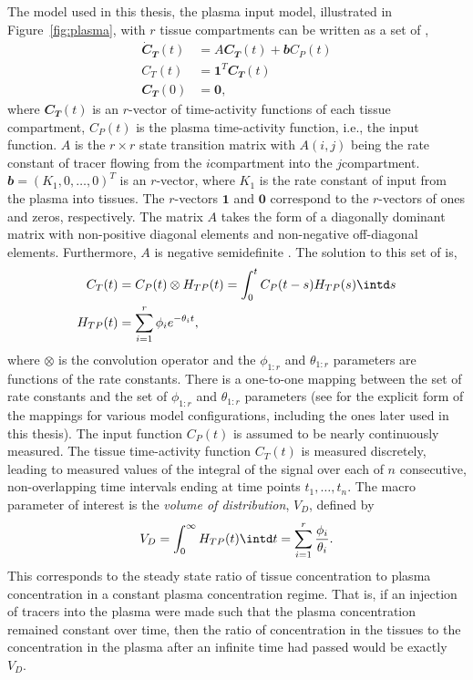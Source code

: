 The model used in this thesis, the plasma input model, illustrated in
Figure~\ref{fig:plasma}, with $r$ tissue compartments can be written as a set
of \ode,
\begin{align*}
  \dot{\mathbfit{C}}_{\mathbfit{T}}(t)
  & = A\mathbfit{C}_{\mathbfit{T}}(t) + \mathbfit{b} C_P(t)\\
  C_T(t)
  & = \mathbf{1}^T\mathbfit{C}_{\mathbfit{T}}(t) \\
  \mathbfit{C}_{\mathbfit{T}}(0) & = \mathbf{0},
\end{align*}
where $\mathbfit{C}_{\mathbfit{T}}(t)$ is an $r$-vector of time-activity
functions of each tissue compartment, $C_P(t)$ is the plasma time-activity
function, i.e., the input function. $A$ is the $r \times r$ state transition
matrix with $A(i,j)$ being the rate constant of tracer flowing from the
$i$\xth compartment into the $j$\xth compartment. $\mathbfit{b} = (K_1, 0,
\dots, 0)^T$ is an $r$-vector, where $K_1$ is the rate constant of input from
the plasma into tissues. The $r$-vectors $\mathbf{1}$ and $\mathbf{0}$
correspond to the $r$-vectors of ones and zeros, respectively. The matrix $A$
takes the form of a diagonally dominant matrix with non-positive diagonal
elements and non-negative off-diagonal elements. Furthermore, $A$ is negative
semidefinite \cite{Gunn:2001cx}. The solution to this set of \ode is,
\begin{align}
  C_T(t) & = C_P(t) \otimes H_{TP}(t) = \int_0^t C_P(t-s) H_{TP}(s)\intd s
  \label{eq:CT} \\
  H_{TP}(t) & = \sum_{i=1}^r \phi_i e^{-\theta_i t},
  \label{eq:HTP}
\end{align}
where $\otimes$ is the convolution operator and the $\phi_{1:r}$ and
$\theta_{1:r}$ parameters are functions of the rate constants. There is a
one-to-one mapping between the set of rate constants and the set of
$\phi_{1:r}$ and $\theta_{1:r}$ parameters (see \cite{Gunn:2001cx} for the
explicit form of the mappings for various model configurations, including the
ones later used in this thesis). The input function $C_P(t)$ is assumed to be
nearly continuously measured. The tissue time-activity function $C_T(t)$ is
measured discretely, leading to measured values of the integral of the signal
over each of $n$ consecutive, non-overlapping time intervals ending at time
points $t_1, \dots, t_n$. The macro parameter of interest is the \emph{volume
of distribution}, $V_D$, defined by
\begin{equation}
  V_D = \int_0^{\infty} H_{TP}(t) \intd t = \sum_{i=1}^r
  \frac{\phi_i}{\theta_i}.
\end{equation}
This corresponds to the steady state ratio of tissue concentration to
plasma concentration in a constant plasma concentration regime. That is, if
an injection of tracers into the plasma were made such that the plasma
concentration remained constant over time, then the ratio of
concentration in the tissues to the concentration in the plasma after an
infinite time had passed would be exactly $V_D$.

